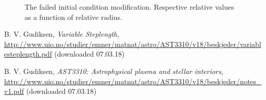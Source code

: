 \documentclass[a4paper,10pt]{article}
\begin{document}
\begin{figure}[!]
\caption{The failed initial condition modification. Respective relative values as a function of relative radius.}
\label{fig:final_error}
\end{figure}


\begin{thebibliography}{9}

  B. V. Gudiksen,
  \textit{Variable Steplength},
  \url{http://www.uio.no/studier/emner/matnat/astro/AST3310/v18/beskjeder/variablesteplength.pdf} (downloaded 07.03.18)

  B. V. Gudiksen,
  \textit{AST3310: Astrophysical plasma and stellar interiors},
  \url{http://www.uio.no/studier/emner/matnat/astro/AST3310/v18/beskjeder/notes_v1.pdf} (downloaded 07.03.18)
\end{thebibliography}
\end{document}

